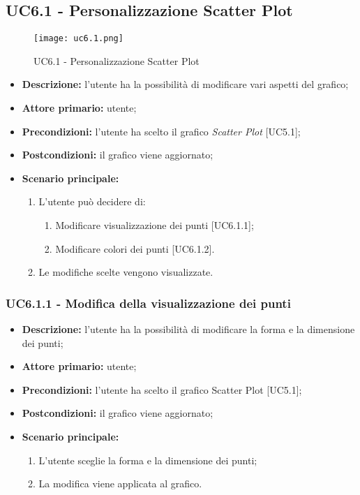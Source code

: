 \subsection{UC6.1 - Personalizzazione Scatter Plot}
\begin{figure}[H]
  \centering
  \texttt{[image: uc6.1.png]}
  \caption{UC6.1 - Personalizzazione Scatter Plot}
\end{figure}
\begin{itemize}
    \item \textbf{Descrizione:} l'utente ha la possibilità di modificare vari aspetti del grafico;
    \item \textbf{Attore primario:} utente;
    \item \textbf{Precondizioni:} l’utente ha scelto il grafico \textit{Scatter Plot} [UC5.1];
    \item \textbf{Postcondizioni:} il grafico viene aggiornato;
    \item \textbf{Scenario principale:}
    \begin{enumerate}
      \item L'utente può decidere di:
    \begin{enumerate}
      \item Modificare visualizzazione dei punti [UC6.1.1];
      \item Modificare colori dei punti  [UC6.1.2].
    \end{enumerate}
    \item Le modifiche scelte vengono visualizzate.
  \end{enumerate}
  \end{itemize}

    \subsubsection{UC6.1.1 - Modifica della visualizzazione dei punti}
  \begin{itemize}
    \item \textbf{Descrizione:} l'utente ha la possibilità di modificare la forma e la dimensione dei punti;
    \item \textbf{Attore primario:} utente;
    \item \textbf{Precondizioni:} l’utente ha scelto il grafico Scatter Plot [UC5.1];
    \item \textbf{Postcondizioni:} il grafico viene aggiornato;
    \item \textbf{Scenario principale:}
     \begin{enumerate}
      \item L'utente sceglie la forma e la dimensione dei punti;
      \item La modifica viene applicata al grafico.
    \end{enumerate}
  \end{itemize}

